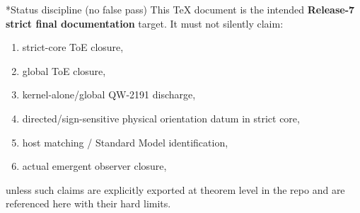 \documentclass[11pt,a4paper]{article}
\makeatletter
\newcommand{\chapter}{\@ifstar{\section*}{\section}}
\makeatother
\begin{document}
\chapter*{Status discipline (no false pass)}
This TeX document is the intended \textbf{Release-7 strict final documentation} target.
It must not silently claim:
\begin{enumerate}[label=\arabic*.]
  \item strict-core ToE closure,
  \item global ToE closure,
  \item kernel-alone/global QW-2191 discharge,
  \item directed/sign-sensitive physical orientation datum in strict core,
  \item host matching / Standard Model identification,
  \item actual emergent observer closure,
\end{enumerate}
unless such claims are explicitly exported at theorem level in the repo and are referenced here with their hard limits.
\end{document}
